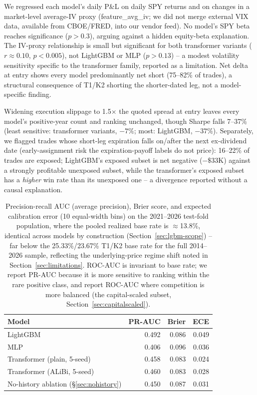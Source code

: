 \documentclass[sigconf,review,anonymous]{acmart}
\begin{document}
We regressed each model's daily P\&L on daily SPY returns and on changes in a market-level average-IV proxy (feature\_avg\_iv; we did not merge external VIX data, available from CBOE/FRED, into our vendor feed). No model's SPY beta reaches significance ($p>0.3$), arguing against a hidden equity-beta explanation. The IV-proxy relationship is small but significant for both transformer variants ($r\approx0.10$, $p<0.005$), not LightGBM or MLP ($p>0.13$) -- a modest volatility sensitivity specific to the transformer family, reported as a limitation. Net delta at entry shows every model predominantly net short (75--82\% of trades), a structural consequence of T1/K2 shorting the shorter-dated leg, not a model-specific finding.

Widening execution slippage to 1.5$\times$ the quoted spread at entry leaves every model's positive-year count and ranking unchanged, though Sharpe falls 7--37\% (least sensitive: transformer variants, $-7\%$; most: LightGBM, $-37\%$). Separately, we flagged trades whose short-leg expiration falls on/after the next ex-dividend date (early-assignment risk the expiration-payoff labels do not price): 16--22\% of trades are exposed; LightGBM's exposed subset is net negative ($-\$33$K) against a strongly profitable unexposed subset, while the transformer's exposed subset has a \emph{higher} win rate than its unexposed one -- a divergence reported without a causal explanation.

\begin{table}[t]
\footnotesize
\begin{tabular}{lrrr}
\toprule
Model & PR-AUC & Brier & ECE \\
\midrule
LightGBM & 0.492 & 0.086 & 0.049 \\
MLP & 0.406 & 0.096 & 0.036 \\
Transformer (plain, 5-seed) & 0.458 & 0.083 & 0.024 \\
Transformer (ALiBi, 5-seed) & 0.460 & 0.083 & 0.028 \\
No-history ablation (\S\ref{sec:nohistory}) & 0.450 & 0.087 & 0.031 \\
\bottomrule
\end{tabular}
\caption{Precision-recall AUC (average precision), Brier score, and expected calibration error (10 equal-width bins) on the 2021--2026 test-fold population, where the pooled realized base rate is $\approx$13.8\%, identical across models by construction (Section~\ref{sec:lgbm-scope}) -- far below the 25.33\%/23.67\% T1/K2 base rate for the full 2014--2026 sample, reflecting the underlying-price regime shift noted in Section~\ref{sec:limitations}. ROC-AUC is invariant to base rate; we report PR-AUC because it is more sensitive to ranking within the rare positive class, and report ROC-AUC where competition is more balanced (the capital-scaled subset, Section~\ref{sec:capitalscaled}).}
\label{tab:calibration}
\end{table}
\end{document}
